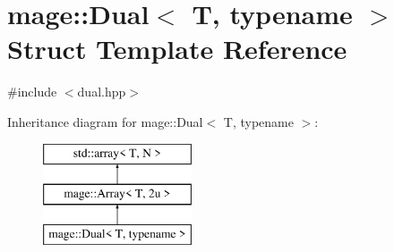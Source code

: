 \hypertarget{structmage_1_1_dual}{}\section{mage\+:\+:Dual$<$ T, typename $>$ Struct Template Reference}
\label{structmage_1_1_dual}


{\ttfamily \#include $<$dual.\+hpp$>$}

Inheritance diagram for mage\+:\+:Dual$<$ T, typename $>$\+:\begin{figure}[H]
\begin{center}
\leavevmode
\includegraphics[height=3.000000cm]{structmage_1_1_dual}
\end{center}
\end{figure}
